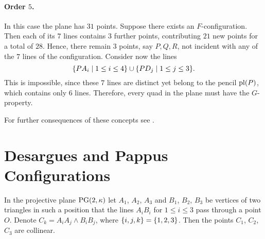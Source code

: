 \begin{rem}
    \paragraph{Order $5$.} In this case the plane has $31$ points. Suppose there exists an $F$-configuration. Then each of its $7$ lines contains $3$ further points, contributing $21$ new points for a total of $28$. Hence, there remain $3$ points, say $P,Q,R$, not incident with any of the $7$ lines of the configuration. Consider now the lines
    \[
        \{PA_i\mid 1\le i\le4\} \cup \{PD_j\mid 1\le j\le3\}.
    \]
    This is impossible, since these $7$ lines are distinct yet belong to the pencil $\operatorname{pl}(P)$, which contains only $6$ lines. Therefore, every quad in the plane must have the $G$-property.

    For further consequences of these concepts see \citep{Stanton1996}.
\end{rem}

\section{Desargues and Pappus Configurations}

\begin{thm}\label{thm:desargues} {\upshape[Desargues (1639)]}
    In the projective plane $\operatorname{PG}(2,\kappa)$ let\/ $A_1$, $A_2$, $A_3$ and\/ $B_1$, $B_2$, $B_3$ be vertices of two triangles in such a position that the lines\/ $A_iB_i$ for $1\le i\le 3$ pass through a point\/ $O$. Denote\/ $C_k=A_iA_j\wedge B_iB_j$, where\/ $\{i,j,k\}= \{1,2,3\}$. Then the points\/ $C_1$, $C_2$, $C_3$ are collinear.
\end{thm}

